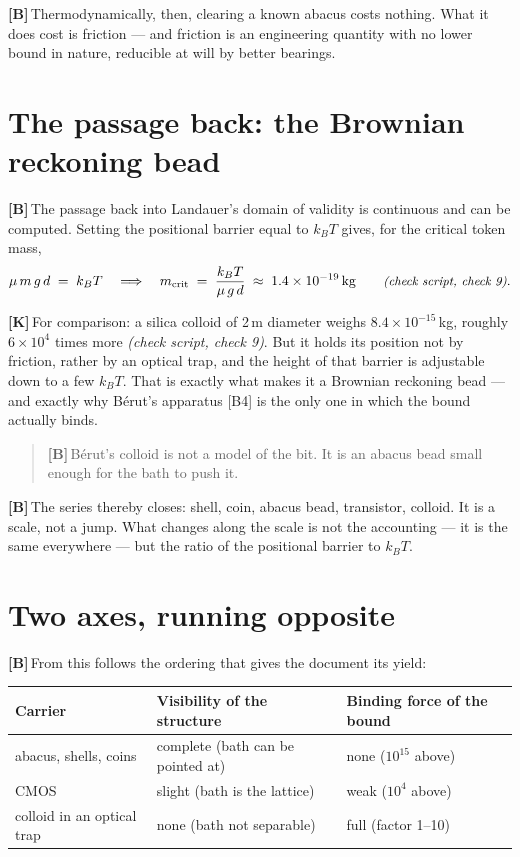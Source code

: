 \documentclass[11pt,a4paper]{article}
\newcommand{\LK}{\textcolor{layK}{\textbf{\footnotesize\textsf{[K]}}}\,}
\newcommand{\LB}{\textcolor{layB}{\textbf{\footnotesize\textsf{[B]}}}\,}
\newcommand{\pruef}[1]{{\small\itshape(check script, #1)}}
\begin{document}
\LB Thermodynamically, then, clearing a known abacus costs nothing. What it does
cost is friction --- and friction is an engineering quantity with no lower bound
in nature, reducible at will by better bearings.

\section{The passage back: the Brownian reckoning bead}

\LB The passage back into Landauer's domain of validity is continuous and can be
computed. Setting the positional barrier equal to $k_BT$ gives, for the critical
token mass,
\begin{equation}
  \mu\,m\,g\,d \;=\; k_B T
  \quad\Longrightarrow\quad
  m_{\text{crit}} \;=\; \frac{k_B T}{\mu\,g\,d} \;\approx\; 1.4\times10^{-19}\,\text{kg}
  \qquad \text{\pruef{check 9}} .
\end{equation}

\LK For comparison: a silica colloid of 2\,\textmu m diameter weighs
$8.4\times10^{-15}$\,kg, roughly $6\times10^{4}$ times more \pruef{check 9}. But
it holds its position not by friction, rather by an optical trap, and the height
of that barrier is adjustable down to a few $k_BT$. That is exactly what makes it
a Brownian reckoning bead --- and exactly why Bérut's apparatus [B4] is the only
one in which the bound actually binds.

\begin{quote}
\LB Bérut's colloid is not a model of the bit. It is an abacus bead small enough
for the bath to push it.
\end{quote}

\LB The series thereby closes: shell, coin, abacus bead, transistor, colloid. It
is a scale, not a jump. What changes along the scale is not the accounting --- it
is the same everywhere --- but the ratio of the positional barrier to $k_BT$.

\section{Two axes, running opposite}

\LB From this follows the ordering that gives the document its yield:

\begin{center}
\small
\begin{tabular}{@{}lll@{}}
\toprule
\textbf{Carrier} & \textbf{Visibility of the structure} & \textbf{Binding force of the bound} \\
\midrule
abacus, shells, coins & complete (bath can be pointed at) & none ($10^{15}$ above) \\
CMOS & slight (bath is the lattice) & weak ($10^{4}$ above) \\
colloid in an optical trap & none (bath not separable) & full (factor 1--10) \\
\bottomrule
\end{tabular}
\end{center}
\end{document}
